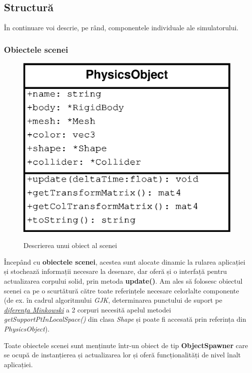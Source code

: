 \documentclass[12pt,a4paper]{report}
\begin{document}
\subsection{Structură}
În continuare voi descrie, pe rând, componentele individuale ale simulatorului.

\subsubsection{Obiectele scenei}
\begin{figure}[H]
	\centering
	\includegraphics[width=0.4\linewidth]{pics/cap4_00.eps}
	\label{fig:physicsObject}
	\caption[]{Descrierea unui obiect al scenei}
\end{figure}

Începând cu \textbf{obiectele scenei}, acestea sunt alocate dinamic la rularea aplicației și stochează informații necesare la desenare, dar oferă și o interfață pentru actualizarea corpului solid, prin metoda \textbf{update()}. Am ales să folosesc obiectul scenei ca pe o scurtătură către toate referințele necesare celorlalte componente (de ex. în cadrul algoritmului \textit{GJK}, determinarea punctului de suport pe \hyperref[minkowski_difference]{\textit{diferența Minkowski}} a 2 corpuri necesită apelul metodei \textit{getSupportPtInLocalSpace()} din clasa \textit{Shape} și poate fi accesată prin referința din \textit{PhysicsObject}).

Toate obiectele scenei sunt menținute într-un obiect de tip \textbf{ObjectSpawner} care se ocupă de instanțierea și actualizarea lor și oferă funcționalități de nivel înalt aplicației.
\end{document}
